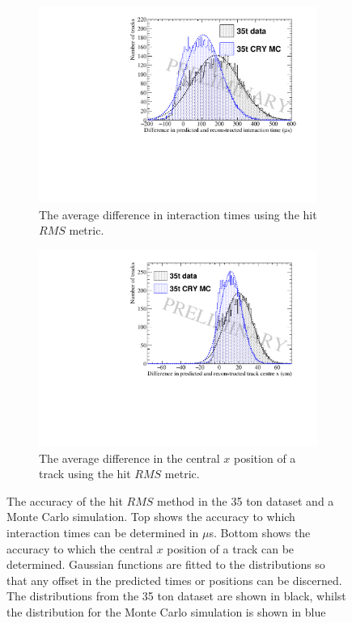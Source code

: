 \begin{figure}[h!]
  \centering
  \begin{subfigure}{0.6\textwidth}
    \centering
    \includegraphics[width=\textwidth]{Overlay_AvTimeDiff_RMS}
    \caption{The average difference in interaction times using the hit $RMS$ metric.}
    \label{fig:DiffOverlayAvDiff_RMS_T}
  \end{subfigure}

  \begin{subfigure}{0.6\textwidth}
    \centering
    \includegraphics[width=\textwidth]{Overlay_AvXPosDiff_RMS}
    \caption{The average difference in the central $x$ position of a track using the hit $RMS$ metric.}
    \label{fig:DiffOverlayAvDiff_RMS_X}
  \end{subfigure}
  \caption[Comparing the accuracy of the hit $RMS$ method in the 35 ton dataset and a Monte Carlo simulation]
          {The accuracy of the hit $RMS$ method in the 35 ton dataset and a Monte Carlo simulation. Top shows the accuracy to which interaction times can be determined in $\mu$s. Bottom shows the accuracy to which the central $x$ position of a track can be determined. Gaussian functions are fitted to the distributions so that any offset in the predicted times or positions can be discerned. The distributions from the 35 ton dataset are shown in black, whilst the distribution for the Monte Carlo simulation is shown in blue}
  \label{fig:DiffOverlayAvDiff_RMS}
\end{figure}

